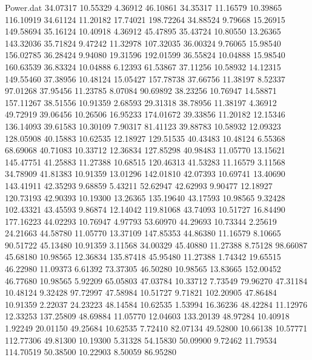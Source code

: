 \begin{filecontents}{Power.dat}
  34.07317   10.55329    4.36912   46.10861
  34.35317   11.16579   10.39865  116.10919
  34.61124   11.20182   17.74021  198.72264
  34.88524    9.79668   15.26915  149.58694
  35.16124   10.40918    4.36912   45.47895
  35.43724   10.80550   13.26365  143.32036
  35.71824    9.47242   11.32978  107.32035
  36.00324    9.76065   15.98540  156.02785
  36.28424    9.94080   19.31596  192.01599
  36.55824   10.04888   15.98540  160.63539
  36.83324   10.04888    6.12393   61.53867
  37.11256   10.58932   14.12315  149.55460
  37.38956   10.48124   15.05427  157.78738
  37.66756   11.38197    8.52337   97.01268
  37.95456   11.23785    8.07084   90.69892
  38.23256   10.76947   14.58871  157.11267
  38.51556   10.91359    2.68593   29.31318
  38.78956   11.38197    4.36912   49.72919
  39.06456   10.26506   16.95233  174.01672
  39.33856   11.20182   12.15346  136.14093
  39.61583   10.30109    7.90317   81.41123
  39.88783   10.58932   12.09323  128.05908
  40.15883   10.62535   12.18927  129.51535
  40.43483   10.48124    6.55368   68.69068
  40.71083   10.33712   12.36834  127.85298
  40.98483   11.05770   13.15621  145.47751
  41.25883   11.27388   10.68515  120.46313
  41.53283   11.16579    3.11568   34.78909
  41.81383   10.91359   13.01296  142.01810
  42.07393   10.69741   13.40690  143.41911
  42.35293    9.68859    5.43211   52.62947
  42.62993    9.90477   12.18927  120.73193
  42.90393   10.19300   13.26365  135.19640
  43.17593   10.98565    9.32428  102.43321
  43.45593    9.86874   12.14042  119.81068
  43.74093   10.51727   16.84490  177.16223
  44.02293   10.76947    4.97793   53.60970
  44.29693   10.73344    2.25619   24.21663
  44.58780   11.05770   13.37109  147.85353
  44.86380   11.16579    8.10665   90.51722
  45.13480   10.91359    3.11568   34.00329
  45.40880   11.27388    8.75128   98.66087
  45.68180   10.98565   12.36834  135.87418
  45.95480   11.27388    1.74342   19.65515
  46.22980   11.09373    6.61392   73.37305
  46.50280   10.98565   13.83665  152.00452
  46.77680   10.98565    5.92209   65.05803
  47.03784   10.33712    7.73549   79.96270
  47.31184   10.48124    9.32428   97.72997
  47.58984   10.51727    9.71821  102.20905
  47.86484   10.91359    2.22037   24.23223
  48.14584   10.62535    1.53994   16.36236
  48.42284   11.12976   12.33253  137.25809
  48.69884   11.05770   12.04603  133.20139
  48.97284   10.40918    1.92249   20.01150
  49.25684   10.62535    7.72410   82.07134
  49.52800   10.66138   10.57771  112.77306
  49.81300   10.19300    5.31328   54.15830
  50.09900    9.72462   11.79534  114.70519
  50.38500   10.22903    8.50059   86.95280

\end{filecontents}
